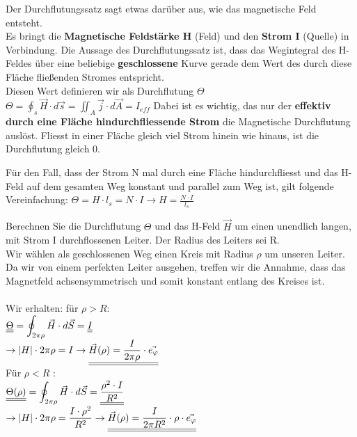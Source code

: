 	\begingl
	Der Durchflutungssatz sagt etwas darüber aus, wie das magnetische Feld entsteht. \\
	 Es bringt die \textbf{Magnetische Feldstärke H} (Feld) und den \textbf{Strom I} (Quelle) in Verbindung.
	Die Aussage des Durchflutungssatz ist, dass das Wegintegral des H-Feldes über eine beliebige \textbf{geschlossene} Kurve gerade dem Wert des durch diese Fläche fließenden Stromes entspricht. \\
	Diesen Wert definieren wir als Durchflutung $\Theta$ \\
	\formulaBegin
	$\displaystyle \Theta = \oint_{s} \vec{H} \cdot d\vec{s} = \iint_{A} \vec{j} \cdot d\vec{A} = I_{eff}$
	\formulaEnd
	Dabei ist es wichtig, das nur der \textbf{effektiv durch eine Fläche hindurchfliessende Strom} die Magnetische Durchflutung auslöst. Fliesst in einer Fläche gleich viel Strom hinein wie hinaus, ist die Durchflutung gleich 0.
	\iend

	\begingl
	Für den Fall, dass der Strom N mal durch eine Fläche hindurchfliesst und das H-Feld auf dem gesamten Weg konstant und parallel zum Weg ist, gilt folgende Vereinfachung:
	\formulaBegin
	$\displaystyle \Theta = H \cdot l_s = N\cdot I \rightarrow H = \frac{N \cdot I}{l_s}$
	\formulaEnd
	\iend

	\beginbsp
	Berechnen Sie die Durchflutung $\Theta$ und das H-Feld $\vec{H}$ um einen unendlich langen, mit Strom I durchflossenen Leiter. Der Radius des Leiters sei R. \\
	\iend
	\beginbsp
	Wir wählen als geschlossenen Weg einen Kreis mit Radius $\rho$ um unseren Leiter. \\
	Da wir von einem perfekten Leiter ausgehen, treffen wir die Annahme, dass das Magnetfeld achsensymmetrisch und somit konstant entlang des Kreises ist. \\
	\\
	Wir erhalten: für  $ \rho > R$: \\
	$\displaystyle  \underline{\underline{\Theta}} =  \oint_{2\pi \rho} \vec{H} \cdot d\vec{S} = \underline{\underline{I}} $ \\
	$ \displaystyle \rightarrow |H| \cdot 2 \pi \rho = I \rightarrow \underline{\underline{\vec{H}(\rho) = \frac{I}{2 \pi \rho} \cdot \vec{e_{\varphi}}}} $\\

	Für  $ \rho < R $ : \\
	$\displaystyle  \underline{\underline{\Theta(\rho)}} =  \oint_{2\pi \rho} \vec{H} \cdot d\vec{S} =   \underline{\underline{\frac{\rho^2\cdot I}{R^2}}} 		  $ \\
	$ \displaystyle \rightarrow |H| \cdot 2 \pi \rho = \frac{I \cdot \rho^2}{R^2} \rightarrow \underline{\underline{\vec{H}(\rho) = \frac{I}{2\pi R^2} \cdot \rho \cdot \vec{e_{\varphi}}}} $

